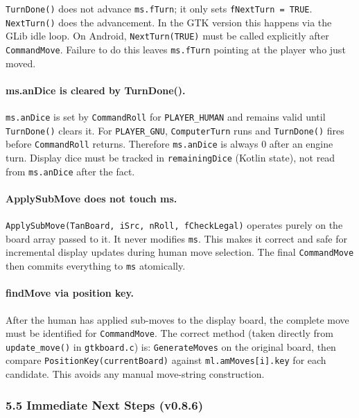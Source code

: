 \documentclass[11pt,a4paper]{article}
\begin{document}
\texttt{TurnDone()} does not advance \texttt{ms.fTurn}; it only sets
\texttt{fNextTurn = TRUE}. \texttt{NextTurn()} does the advancement.
In the GTK version this happens via the GLib idle loop. On Android,
\texttt{NextTurn(TRUE)} must be called explicitly after
\texttt{CommandMove}. Failure to do this leaves \texttt{ms.fTurn}
pointing at the player who just moved.

\paragraph{ms.anDice is cleared by TurnDone().}

\texttt{ms.anDice} is set by \texttt{CommandRoll} for \texttt{PLAYER\_HUMAN}
and remains valid until \texttt{TurnDone()} clears it. For
\texttt{PLAYER\_GNU}, \texttt{ComputerTurn} runs and \texttt{TurnDone()}
fires before \texttt{CommandRoll} returns. Therefore \texttt{ms.anDice}
is always 0 after an engine turn. Display dice must be tracked in
\texttt{remainingDice} (Kotlin state), not read from \texttt{ms.anDice}
after the fact.

\paragraph{ApplySubMove does not touch ms.}

\texttt{ApplySubMove(TanBoard, iSrc, nRoll, fCheckLegal)} operates
purely on the board array passed to it. It never modifies \texttt{ms}.
This makes it correct and safe for incremental display updates during
human move selection. The final \texttt{CommandMove} then commits
everything to \texttt{ms} atomically.

\paragraph{findMove via position key.}

After the human has applied sub-moves to the display board, the
complete move must be identified for \texttt{CommandMove}. The correct
method (taken directly from \texttt{update\_move()} in
\texttt{gtkboard.c}) is: \texttt{GenerateMoves} on the original board,
then compare \texttt{PositionKey(currentBoard)} against
\texttt{ml.amMoves[i].key} for each candidate. This avoids any manual
move-string construction.

\subsubsection{5.5 Immediate Next Steps (v0.8.6)}\label{next-steps-v085}
\end{document}

